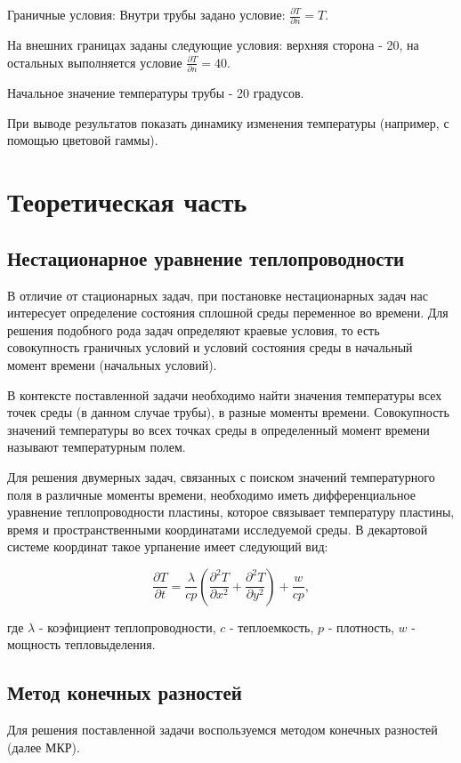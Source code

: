 \documentclass[12pt, a4paper]{article}
\begin{document}
    Граничные условия:
    Внутри трубы задано условие: $\frac{\partial T}{\partial n} = T$.
    
    На внешних границах заданы следующие условия: верхняя сторона - 20, на остальных выполняется условие $\frac{\partial T}{\partial n} = 40$.
    
    Начальное значение температуры трубы - 20 градусов.
    
    При выводе результатов показать динамику изменения температуры (например, с помощью цветовой гаммы).
	
	\section{Теоретическая часть}
	\subsection{Нестационарное уравнение теплопроводности}
	
	В отличие от стационарных задач, при постановке нестационарных задач нас интересует определение состояния сплошной среды переменное во времени. Для решения подобного рода задач определяют краевые условия, то есть совокупность граничных условий и условий состояния среды в начальный момент времени (начальных условий).
	
	В контексте поставленной задачи необходимо найти значения температуры всех точек среды (в данном случае трубы), в разные моменты времени. Совокупность значений температуры во всех точках среды в определенный момент времени называют температурным полем.
	
	Для решения двумерных задач, связанных с поиском значений температурного поля в различные моменты времени, необходимо иметь дифференциальное уравнение теплопроводности пластины, которое связывает температуру пластины, время и пространственными координатами исследуемой среды. В декартовой системе координат такое урпанение имеет следующий вид:
	
	\[
	\frac{\partial T}{\partial t} = \frac{\lambda}{cp}\left( \frac{\partial^2 T}{\partial x^2}  + \frac{\partial^2 T}{\partial y^2} \right) + \frac{w}{cp},
	\]
	
	где $\lambda$ - коэфициент теплопроводности, $c$ - теплоемкость, $p$ - плотность, $w$ - мощность тепловыделения.
	
	\subsection{Метод конечных разностей}
	Для решения поставленной задачи воспользуемся методом конечных разностей (далее МКР).
	
\end{document}
